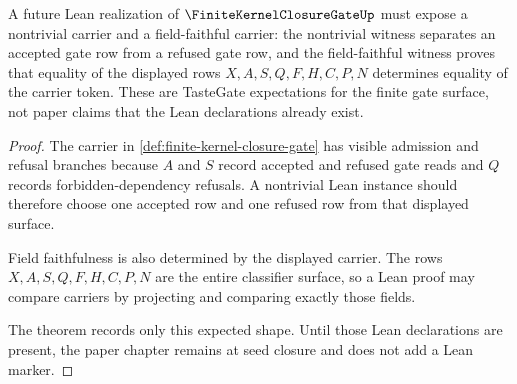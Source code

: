\begin{theorem}
\label{thm:finite-kernel-closure-gate-tastegate-expectation}
A future Lean realization of $\FiniteKernelClosureGateUp$ must expose a nontrivial carrier and a field-faithful carrier: the nontrivial witness separates an accepted gate row from a refused gate row, and the field-faithful witness proves that equality of the displayed rows $X,A,S,Q,F,H,C,P,N$ determines equality of the carrier token. These are TasteGate expectations for the finite gate surface, not paper claims that the Lean declarations already exist.
\end{theorem}
\begin{proof}
The carrier in \autoref{def:finite-kernel-closure-gate} has visible admission and refusal branches because $A$ and $S$ record accepted and refused gate reads and $Q$ records forbidden-dependency refusals. A nontrivial Lean instance should therefore choose one accepted row and one refused row from that displayed surface.

Field faithfulness is also determined by the displayed carrier. The rows $X,A,S,Q,F,H,C,P,N$ are the entire classifier surface, so a Lean proof may compare carriers by projecting and comparing exactly those fields.

The theorem records only this expected shape. Until those Lean declarations are present, the paper chapter remains at seed closure and does not add a Lean marker.
\end{proof}




